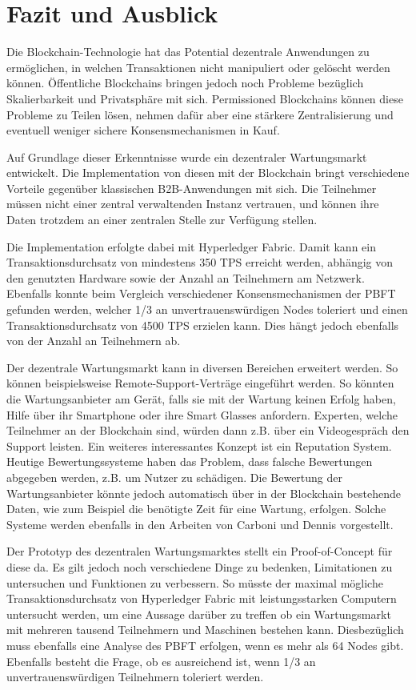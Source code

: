 \chapter{Fazit und Ausblick}
\label{cha:fazit}

Die Blockchain-Technologie hat das Potential dezentrale Anwendungen zu ermöglichen, in welchen Transaktionen nicht manipuliert oder gelöscht werden können. Öffentliche Blockchains bringen jedoch noch Probleme bezüglich Skalierbarkeit und Privatsphäre mit sich. Permissioned Blockchains können diese Probleme zu Teilen lösen, nehmen dafür aber eine stärkere Zentralisierung und eventuell weniger sichere Konsensmechanismen in Kauf. 

Auf Grundlage dieser Erkenntnisse wurde ein dezentraler Wartungsmarkt entwickelt. Die Implementation von diesen mit der Blockchain bringt verschiedene Vorteile gegenüber klassischen B2B-Anwendungen mit sich. Die Teilnehmer müssen nicht einer zentral verwaltenden Instanz vertrauen, und können ihre Daten trotzdem an einer zentralen Stelle zur Verfügung stellen.

Die Implementation erfolgte dabei mit Hyperledger Fabric. Damit kann ein Transaktionsdurchsatz von mindestens 350 TPS erreicht werden, abhängig von den genutzten Hardware sowie der Anzahl an Teilnehmern am Netzwerk. Ebenfalls konnte beim Vergleich verschiedener Konsensmechanismen der PBFT gefunden werden, welcher 1/3 an unvertrauenswürdigen Nodes toleriert und einen Transaktionsdurchsatz von 4500 TPS erzielen kann. Dies hängt jedoch ebenfalls von der Anzahl an Teilnehmern ab.

Der dezentrale Wartungsmarkt kann in diversen Bereichen erweitert werden. So können beispielsweise Remote-Support-Verträge eingeführt werden. So könnten die Wartungsanbieter am Gerät, falls sie mit der Wartung keinen Erfolg haben, Hilfe über ihr Smartphone oder ihre Smart Glasses anfordern. Experten, welche Teilnehmer an der Blockchain sind, würden dann z.B. über ein Videogespräch den Support leisten. Ein weiteres interessantes Konzept ist ein Reputation System. Heutige Bewertungssysteme haben das Problem, dass falsche Bewertungen abgegeben werden, z.B. um Nutzer zu schädigen. Die Bewertung der Wartungsanbieter könnte jedoch automatisch über in der Blockchain bestehende Daten, wie zum Beispiel die benötigte Zeit für eine Wartung, erfolgen. Solche Systeme werden ebenfalls in den Arbeiten von Carboni \cite{CarboniFeedbackbasedReputation2015} und Dennis \cite{DennisRepblocknext2015} vorgestellt.

Der Prototyp des dezentralen Wartungsmarktes stellt ein Proof-of-Concept für diese da. Es gilt jedoch noch verschiedene Dinge zu bedenken, Limitationen zu untersuchen und Funktionen zu verbessern. So müsste der maximal mögliche Transaktionsdurchsatz von Hyperledger Fabric mit leistungsstarken Computern untersucht werden, um eine Aussage darüber zu treffen ob ein Wartungsmarkt mit mehreren tausend Teilnehmern und Maschinen bestehen kann. Diesbezüglich muss ebenfalls eine Analyse des PBFT erfolgen, wenn es mehr als 64 Nodes gibt. Ebenfalls besteht die Frage, ob es ausreichend ist, wenn 1/3 an unvertrauenswürdigen Teilnehmern toleriert werden.

